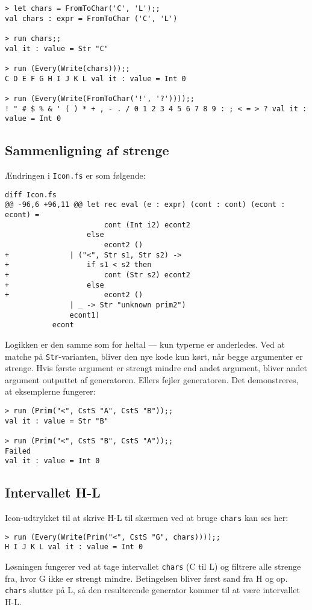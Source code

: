 \begin{verbatim}
> let chars = FromToChar('C', 'L');;
val chars : expr = FromToChar ('C', 'L')

> run chars;;
val it : value = Str "C"

> run (Every(Write(chars)));;
C D E F G H I J K L val it : value = Int 0

> run (Every(Write(FromToChar('!', '?'))));;
! " # $ % & ' ( ) * + , - . / 0 1 2 3 4 5 6 7 8 9 : ; < = > ? val it : value = Int 0
\end{verbatim}

\subsection{Sammenligning af strenge}

Ændringen i \texttt{Icon.fs} er som følgende:

\begin{verbatim}
diff Icon.fs
@@ -96,6 +96,11 @@ let rec eval (e : expr) (cont : cont) (econt : econt) =
                       cont (Int i2) econt2
                   else
                       econt2 ()
+              | ("<", Str s1, Str s2) ->
+                  if s1 < s2 then
+                      cont (Str s2) econt2
+                  else
+                      econt2 ()
               | _ -> Str "unknown prim2")
               econt1)
           econt
\end{verbatim}

Logikken er den samme som for heltal --- kun typerne er anderledes. Ved at matche på \texttt{Str}-varianten, bliver den nye kode kun kørt, når begge argumenter er strenge. Hvis første argument er strengt mindre end andet argument, bliver andet argument outputtet af generatoren. Ellers fejler generatoren. Det demonstreres, at eksemplerne fungerer:

\begin{verbatim}
> run (Prim("<", CstS "A", CstS "B"));;
val it : value = Str "B"

> run (Prim("<", CstS "B", CstS "A"));;
Failed
val it : value = Int 0
\end{verbatim}

\subsection{Intervallet H-L}

Icon-udtrykket til at skrive H-L til skærmen ved at bruge \texttt{chars} kan ses her:

\begin{verbatim}
> run (Every(Write(Prim("<", CstS "G", chars))));;
H I J K L val it : value = Int 0
\end{verbatim}

Løsningen fungerer ved at tage intervallet \texttt{chars} (C til L) og filtrere alle strenge fra, hvor G ikke er strengt mindre. Betingelsen bliver først sand fra H og op. \texttt{chars} slutter på L, så den resulterende generator kommer til at være intervallet H-L.
